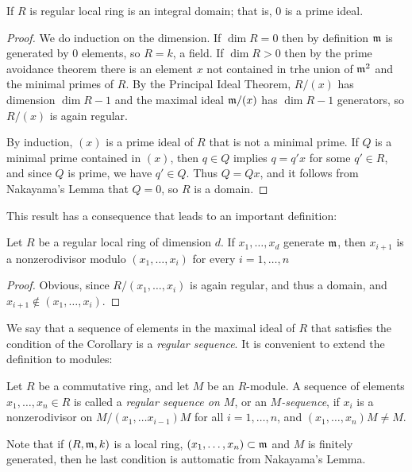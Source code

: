 \begin{proposition}
 If $R$ is regular local ring is an integral domain; that is, 0 is a prime ideal.
\end{proposition}
\begin{proof}
 We do induction on the dimension. If $\dim R = 0$ then by definition $\gm$ is generated by 0 elements, so $R = k$,
 a field. If $\dim R>0$ then by the prime avoidance theorem \cite[]{E} there is an element $x$ not contained in trhe union of $\gm^{2}$ and the minimal primes of $R$. By the Principal Ideal Theorem, $R/(x)$ has dimension $\dim R -1$ and the maximal ideal $\gm/(x)$ has $\dim R-1$ generators, so $R/(x)$ is again regular.
 
 By induction, $(x)$ is a prime ideal of $R$ that is not a minimal prime. If $Q$ is a minimal prime contained in $(x)$,
 then $q\in Q$ implies $q = q'x$ for some $q'\in R$, and since $Q$ is prime, we have $q'\in Q$. Thus
 $Q = Qx$, and it follows from Nakayama's Lemma that $Q=0$, so $R$ is a domain.
\end{proof}

This result has a consequence that leads to an important definition:

\begin{corollary}
 Let $R$ be a regular local ring of dimension $d$. If $x_{1}, \dots, x_{d}$  generate $\gm$, then 
 $x_{i+1}$ is a nonzerodivisor modulo $(x_{1}, \dots, x_{i})$ for every $i = 1,\dots, n$
\end{corollary}
\begin{proof}
 Obvious, since $R/(x_{1},\dots, x_{i})$ is again regular, and thus a domain, and $x_{i+1}\notin (x_{1},\dots,x_{i})$.
\end{proof}

We say that a sequence of elements in the maximal ideal of $R$ that satisfies the condition of the Corollary is a \emph{regular sequence}. It is convenient to extend
the definition to modules:

\begin{definition}
 Let $R$ be a commutative ring, and let $M$ be an $R$-module. A sequence of
 elements $x_{1}, \dots, x_{n}\in R$ is called a \emph{regular sequence on $M$}, or an
 \emph{$M$-sequence}, if
 $x_{i}$ is a nonzerodivisor on $M/(x_{1}, \dots x_{i-1})M$  for all $i= 1,\dots, n$, and 
 $(x_{1}, \dots, x_{n})M \neq M$.
\end{definition}

Note that if $(R,\gm,k)$ is a local ring, $(x_{1},\dots,x_{n})\subset \gm$ and $M$ is finitely generated, then he last condition is auttomatic from Nakayama's Lemma.

